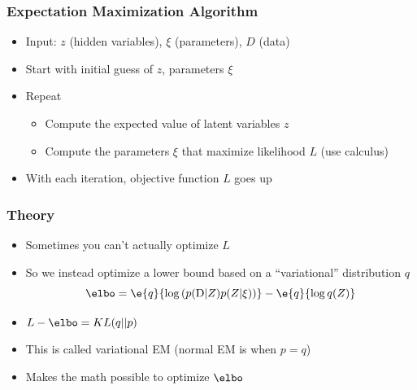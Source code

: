 \begin{frame}
	\frametitle{Expectation Maximization Algorithm}
	
	\begin{itemize}
		\item Input: $z$ (hidden variables), $\xi$ (parameters), $D$ (data)
		\item Start with initial guess of $z$, parameters $\xi$
		\item Repeat
		\begin{itemize}
			\item {} Compute the expected value of latent variables $z$ 		
			\item {} Compute the parameters $\xi$ that maximize likelihood $L$ (use calculus)
		\end{itemize}
		\item With each iteration, objective function $L$ goes up
	\end{itemize}

\end{frame}

\begin{frame}
	\frametitle{Theory}

	\begin{itemize}
		\item Sometimes you can't actually optimize $L$
		\item So we instead optimize a lower bound based on a ``variational'' distribution $q$
\begin{equation}
  \elbo = \e{q}{\log \left(p(\mbox{D} | Z) p(Z | \xi) \right) } - \e{q}{\log q(Z)}
  \label{eq:elboexpec}
\end{equation}
	\item $L - \elbo = KL(q || p)$
	\item This is called variational EM (normal EM is when $p = q$)
	\item Makes the math possible to optimize $\elbo$
	\end{itemize}

\end{frame}


